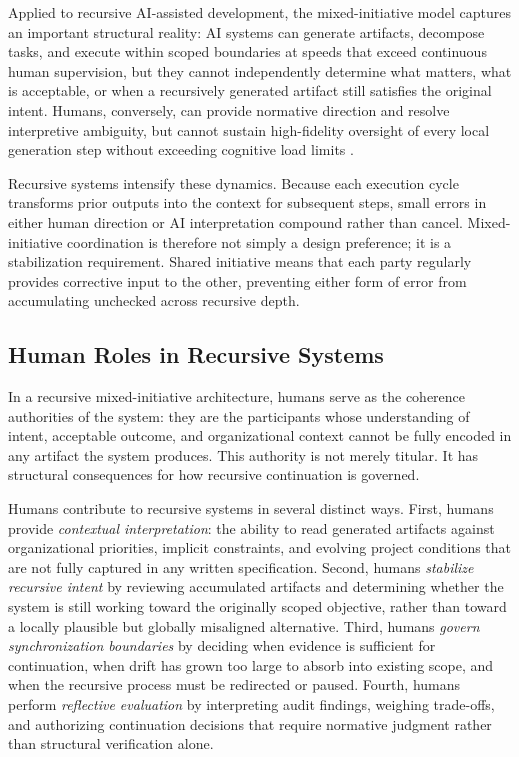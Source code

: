 Applied to recursive AI-assisted development, the mixed-initiative model captures an important structural reality: AI systems can generate artifacts, decompose tasks, and execute within scoped boundaries at speeds that exceed continuous human supervision, but they cannot independently determine what matters, what is acceptable, or when a recursively generated artifact still satisfies the original intent. Humans, conversely, can provide normative direction and resolve interpretive ambiguity, but cannot sustain high-fidelity oversight of every local generation step without exceeding cognitive load limits \cite{Sweller1988CognitiveLoad,Simon1957ModelsMan}.

Recursive systems intensify these dynamics. Because each execution cycle transforms prior outputs into the context for subsequent steps, small errors in either human direction or AI interpretation compound rather than cancel. Mixed-initiative coordination is therefore not simply a design preference; it is a stabilization requirement. Shared initiative means that each party regularly provides corrective input to the other, preventing either form of error from accumulating unchecked across recursive depth.

\subsection{Human Roles in Recursive Systems}

In a recursive mixed-initiative architecture, humans serve as the coherence authorities of the system: they are the participants whose understanding of intent, acceptable outcome, and organizational context cannot be fully encoded in any artifact the system produces. This authority is not merely titular. It has structural consequences for how recursive continuation is governed.

Humans contribute to recursive systems in several distinct ways. First, humans provide \textit{contextual interpretation}: the ability to read generated artifacts against organizational priorities, implicit constraints, and evolving project conditions that are not fully captured in any written specification. Second, humans \textit{stabilize recursive intent} by reviewing accumulated artifacts and determining whether the system is still working toward the originally scoped objective, rather than toward a locally plausible but globally misaligned alternative. Third, humans \textit{govern synchronization boundaries} by deciding when evidence is sufficient for continuation, when drift has grown too large to absorb into existing scope, and when the recursive process must be redirected or paused. Fourth, humans perform \textit{reflective evaluation} by interpreting audit findings, weighing trade-offs, and authorizing continuation decisions that require normative judgment rather than structural verification alone.

